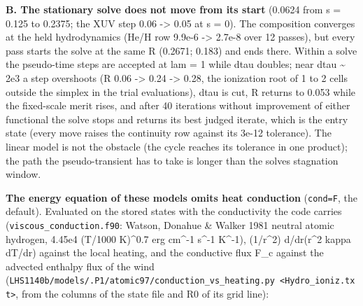 \documentclass[english,a4paper]{my_memo}
\begin{document}
\textbf{B. The stationary solve does not move from its start} (0.0624 from
s = 0.125 to 0.2375; the XUV step 0.06 -\textgreater{} 0.05 at s = 0). The composition
converges at the held hydrodynamics (He/H row 9.9e-6 -\textgreater{} 2.7e-8 over 12
passes), but every pass starts the solve at the same \textbar\textbar R\textbar\textbar{} (0.2671; 0.183)
and ends there. Within a solve the pseudo-time steps are accepted at
lam = 1 while dtau doubles; near dtau \textasciitilde{} 2e3 a step overshoots (\textbar\textbar R\textbar\textbar{}
0.06 -\textgreater{} 0.24 -\textgreater{} 0.28, the ionization root of 1 to 2 cells outside the
simplex in the trial evaluations), dtau is cut, \textbar\textbar R\textbar\textbar{} returns to 0.053 while
the fixed-scale merit rises, and after 40 iterations without improvement of
either functional the solve stops and returns its best judged iterate,
which is the entry state (every move raises the continuity row against its
3e-12 tolerance). The linear model is not the obstacle (the cycle reaches
its tolerance in one product); the path the pseudo-transient has to take is
longer than the solve\textquotesingle s stagnation window.

\textbf{The energy equation of these models omits heat conduction} (\texttt{cond=F},
the default). Evaluated on the stored states with the conductivity the code
carries (\texttt{viscous\_conduction.f90}: Watson, Donahue \& Walker 1981 neutral
atomic hydrogen, 4.45e4 (T/1000 K)\^{}0.7 erg cm\^{}-1 s\^{}-1 K\^{}-1),
\textbar(1/r\^{}2) d/dr(r\^{}2 kappa dT/dr)\textbar{} against the local heating, and the
conductive flux F\_c against the advected enthalpy flux of the wind
(\texttt{LHS1140b/models/.P1/atomic97/conduction\_vs\_heating.py\ \textless{}Hydro\_ioniz.txt\textgreater{}},
from the columns of the state file and R0 of its grid line):
\end{document}
